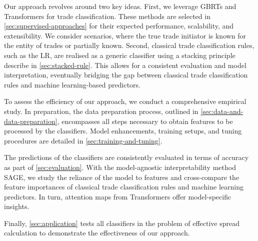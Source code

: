 Our approach revolves around two key ideas. First, we leverage \glspl{GBRT} and Transformers for trade classification. These methods are selected in \cref{sec:supervised-approaches} for their expected performance, scalability, and extensibility. We consider scenarios, where the true trade initiator is known for the entity of trades or partially known. Second, classical trade classification rules, such as the \gls{LR}, are realised as a generic classifier using a stacking principle describe in \cref{sec:stacked-rule}. This allows for a consistent evaluation and model interpretation, eventually bridging the gap between classical trade classification rules and machine learning-based predictors.

\begin{figure}[!ht]
    \centering
    {\renewcommand\normalsize{\tiny}
        \normalsize
        }
    \label{fig:research-framework}
\end{figure}

To assess the efficiency of our approach, we conduct a comprehensive empirical study. In preparation, the data preparation process, outlined in \cref{sec:data-and-data-preparation}, encompasses all steps necessary to obtain features to be processed by the classifiers. Model enhancements, training setups, and tuning procedures are detailed in \cref{sec:training-and-tuning}. 

The predictions of the classifiers are consistently evaluated in terms of accuracy as part of \cref{sec:evaluation}. With the model-agnostic interpretability method \gls{SAGE}, we study the reliance of the model to features and cross-compare the feature importances of classical trade classification rules and machine learning predictors. In turn, attention maps from Transformers offer model-specific insights.

Finally, \cref{sec:application} tests all classifiers in the problem of effective spread calculation to demonstrate the effectiveness of our approach.
